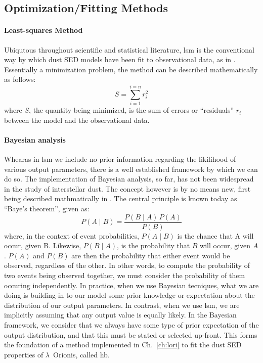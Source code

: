        \subsection{Optimization/Fitting Methods}

       \paragraph{Least-squares Method}

        Ubiqutous throughout scientific and statistical literature, \acrshort{lsm} is the conventional way by which dust SED models have been fit to observational data, as in \cite{tibbs11}. Essentially a minimization problem, the method can be described mathematically as follows:
        \begin{equation}
             S=\sum_{i=1}^{i=n}r_i^2
        \end{equation}
        where $S$, the quantity being minimized, is the sum of errors or ``residuals'' $r_{i}$ between the model  and the observational data.

       \paragraph{Bayesian analysis}

       Whearas in \acrshort{lsm} we include no prior information regarding the likilihood of various output parameters, there is a well established framework by which we can do so.  The implementation of Bayesian analysis, so far, has not been widespread in the study of interstellar dust. The concept however is by no means new, first being described mathmatically in \cite{bayes1763}. The central principle is known today as ``Baye's theorem'', given as:
           \begin{equation}
               P(A\mid{} B) = \frac{P(B \mid{} A) \, P(A)}{P(B)}
           \end{equation}
        where, in the context of event probabilities, $P(A\mid{} B)$ is the chance that A will occur, given B. Likewise, $P(B\mid{} A)$, is the probability that $B$ will occur, given $A$. $P(A)$ and $P(B)$ are then the probability that either event would be observed, regardless of the other. In other words, to compute the probability of two events being observed together, we must consider the probability of them occuring independently. In practice, when we use Bayesian tecniques, what we are doing is building-in to our model some prior knowledge or expectation about the distribution of our output parameters. In contrast, when we use \acrshort{lsm}, we are implicitly assuming that any output value is equally likely. In the Bayesian framework, we consider that we always have some type of prior expectation of the output distribution, and that this must be stated or selected up-front. This forms the foundation of a method implemented in Ch.~\ref{ch:lori} to fit the dust SED properties of $\lambda$~Orionis, called \acrlong{hb}.


